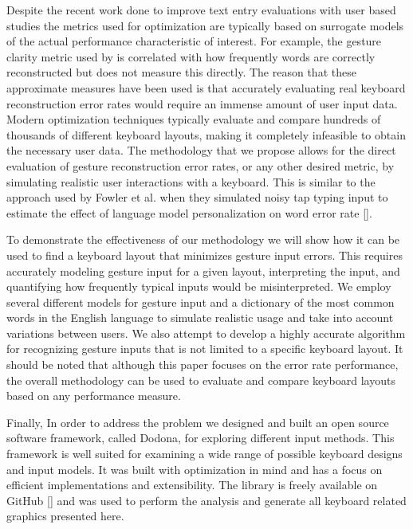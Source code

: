 \documentclass[final,1p,times,authoryear]{elsarticle}
\begin{document}
Despite the recent work done to improve text entry evaluations with user based studies the metrics used for optimization are typically based on surrogate models of the actual performance characteristic of interest.
For example, the gesture clarity metric used by \cite{googleKeyboard} is correlated with how frequently words are correctly reconstructed but does not measure this directly.
The reason that these approximate measures have been used is that accurately evaluating real keyboard reconstruction error rates would require an immense amount of user input data.
Modern optimization techniques typically evaluate and compare hundreds of thousands of different keyboard layouts, making it completely infeasible to obtain the necessary user data.
The methodology that we propose allows for the direct evaluation of gesture reconstruction error rates, or any other desired metric, by simulating realistic user interactions with a keyboard.
This is similar to the approach used by Fowler et al\mbox{.} when they simulated noisy tap typing input to estimate the effect of language model personalization on word error rate [\cite{Fowler}].

To demonstrate the effectiveness of our methodology we will show how it can be used to find a keyboard layout that minimizes gesture input errors.
This requires accurately modeling gesture input for a given layout, interpreting the input, and quantifying how frequently typical inputs would be misinterpreted.
We employ several different models for gesture input and a dictionary of the most common words in the English language to simulate realistic usage and take into account variations between users.
We also attempt to develop a highly accurate algorithm for recognizing gesture inputs that is not limited to a specific keyboard layout.
It should be noted that although this paper focuses on the error rate performance, the overall methodology can be used to evaluate and compare keyboard layouts based on any performance measure.

Finally, In order to address the problem we designed and built an open source software framework, called Dodona, for exploring different input methods.
This framework is well suited for examining a wide range of possible keyboard designs and input models.
It was built with optimization in mind and has a focus on efficient implementations and extensibility.
The library is freely available on GitHub [\cite{dodona}] and was used to perform the analysis and generate all keyboard related graphics presented here.
\end{document}
